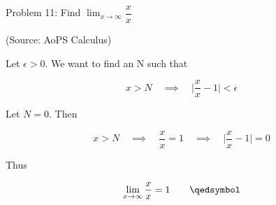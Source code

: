 \usepackage{amsthm}

Problem 11: Find $\lim_{x \rightarrow \infty} \dfrac{x}{x}$

(Source: AoPS Calculus)

Let $\epsilon > 0$. We want to find an N such that 

$$ x > N \quad \implies \quad \Bigg|\frac{x}{x} - 1\Bigg| < \epsilon $$

Let $N = 0$. Then

$$ x > N \quad \implies \quad \frac{x}{x} = 1 \quad \implies \quad \Bigg|\frac{x}{x} - 1\Bigg| = 0 $$

Thus

$$ \lim_{x \rightarrow \infty} \dfrac{x}{x} = 1 \qquad \qedsymbol $$
